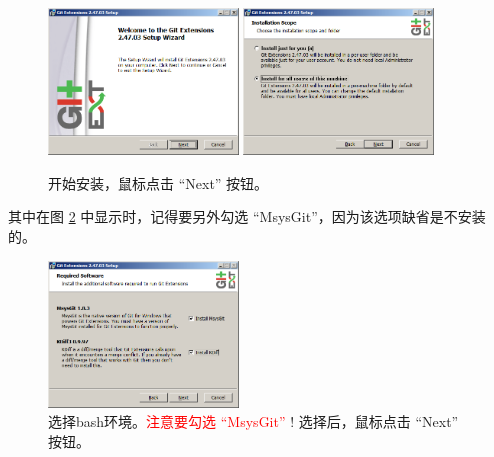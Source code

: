 \documentclass{article}
\begin{document}
\begin{figure}[ht]\centering
  \includegraphics[width=0.45\textwidth]{figures/git/set1.png}
  \includegraphics[width=0.45\textwidth]{figures/git/set2.png}
  \caption{开始安装，鼠标点击 ``Next'' 按钮。}\label{fig:set1}
\end{figure}


其中在图 \ref{fig:set3} 中显示时，记得要另外勾选 ``MsysGit''，因为该选项缺省是不安装的。

\begin{figure}[ht]\centering
  \includegraphics[width=0.45\textwidth]{figures/git/set3.png}
  \caption{选择bash环境。\textcolor{red}{注意要勾选 ``MsysGit''} ! 选择后，鼠标点击 ``Next'' 按钮。}\label{fig:set3}
\end{figure}
\end{document}

